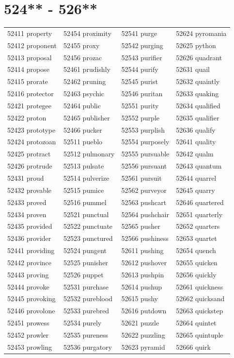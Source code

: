 \documentclass[10pt, oneside]{book}
\begin{document}
\begin{table}
	\centering
	\section*{524** - 526**}
	\begin{tabular}{l l l l}
52411 property &52454 proximity &52541 purge &52624 pyromania\\
52412 proponent &52455 proxy &52542 purging &52625 python\\
52413 proposal &52456 prozac &52543 purifier &52626 quadrant\\
52414 propose &52461 prudishly &52544 purify &52631 quail\\
52415 prorate &52462 pruning &52545 purist &52632 quaintly\\
52416 protector &52463 psychic &52546 puritan &52633 quaking\\
52421 protegee &52464 public &52551 purity &52634 qualified\\
52422 proton &52465 publisher &52552 purple &52635 qualifier\\
52423 prototype &52466 pucker &52553 purplish &52636 qualify\\
52424 protozoan &52511 pueblo &52554 purposely &52641 quality\\
52425 protract &52512 pulmonary &52555 pursuable &52642 qualm\\
52426 protrude &52513 pulsate &52556 pursuant &52643 quantum\\
52431 proud &52514 pulverize &52561 pursuit &52644 quarrel\\
52432 provable &52515 pumice &52562 purveyor &52645 quarry\\
52433 proved &52516 pummel &52563 pushcart &52646 quartered\\
52434 proven &52521 punctual &52564 pushchair &52651 quarterly\\
52435 provided &52522 punctuate &52565 pusher &52652 quarters\\
52436 provider &52523 punctured &52566 pushiness &52653 quartet\\
52441 providing &52524 pungent &52611 pushing &52654 quench\\
52442 province &52525 punisher &52612 pushover &52655 quicken\\
52443 proving &52526 puppet &52613 pushpin &52656 quickly\\
52444 provoke &52531 purchase &52614 pushup &52661 quickness\\
52445 provoking &52532 pureblood &52615 pushy &52662 quicksand\\
52446 provolone &52533 purebred &52616 putdown &52663 quickstep\\
52451 prowess &52534 purely &52621 puzzle &52664 quintet\\
52452 prowler &52535 pureness &52622 puzzling &52665 quintuple\\
52453 prowling &52536 purgatory &52623 pyramid &52666 quirk\\
	\end{tabular}
 \end{table}
\clearpage
\end{document}
